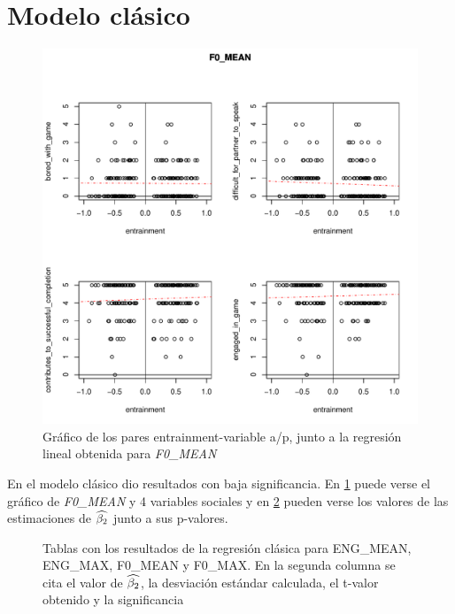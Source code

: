 \section{Modelo clásico}

\begin{figure}[t!]
\includegraphics[width=15cm]{images/regression_F0_MEAN_1.pdf}
\caption{Gráfico de los pares entrainment-variable a/p, junto a la regresión lineal obtenida \label{regresion_clasica} para \emph{F0\_MEAN}}
\end{figure}

En el modelo clásico dio resultados con baja significancia. En \ref{regresion_clasica} puede verse el gráfico de \emph{F0\_MEAN} y 4 variables sociales y en \ref{regresion_clasica_tabla} pueden verse los valores de las estimaciones de $\widehat{\beta_2}$ junto a sus p-valores.

\begin{figure}[l]

\caption{Tablas con los resultados de la regresión clásica para ENG\_MEAN, ENG\_MAX, F0\_MEAN y F0\_MAX. En la segunda columna se cita el valor de $\widehat{\beta_2}$, la desviación estándar calculada, el t-valor obtenido y la significancia}\label{regresion_clasica_tabla}
\end{figure}



